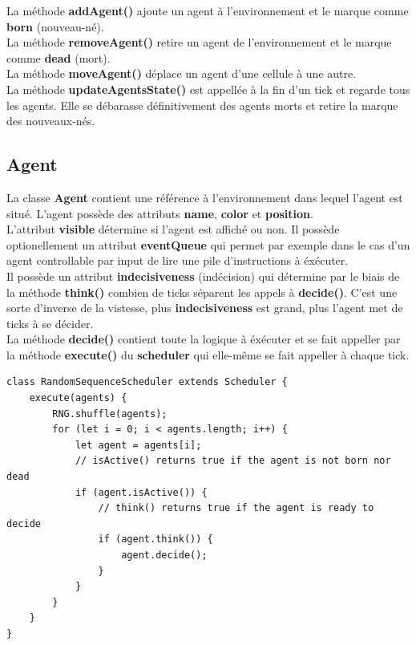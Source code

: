 \documentclass[11pt,a4paper,oneside]{report}
\begin{document}
\par
La méthode \textbf{addAgent()} ajoute un agent à l'environnement et le marque comme \textbf{born} (nouveau-né).\\
La méthode \textbf{removeAgent()} retire un agent de l'environnement et le marque comme \textbf{dead} (mort).\\
La méthode \textbf{moveAgent()} déplace un agent d'une cellule à une autre.\\
La méthode \textbf{updateAgentsState()} est appellée à la fin d'un tick et regarde tous les agents. Elle se débarasse définitivement des agents morts et retire la marque des nouveaux-nés.

\newpage

\subsection*{Agent}
La classe \textbf{Agent} contient une référence à l'environnement dans lequel l'agent est situé. L'agent possède des attributs \textbf{name}, \textbf{color} et \textbf{position}.\\
L'attribut \textbf{visible} détermine si l'agent est affiché ou non.
Il possède optionellement un attribut \textbf{eventQueue} qui permet par exemple dans le cas d'un agent controllable par input de lire une pile d'instructions à éxécuter.\\
Il possède un attribut \textbf{indecisiveness} (indécision) qui détermine par le biais de la méthode \textbf{think()} combien de ticks séparent les appels à \textbf{decide()}. C'est une sorte d'inverse de la vistesse, plus \textbf{indecisiveness} est grand, plus l'agent met de ticks à se décider.\\
La méthode \textbf{decide()} contient toute la logique à éxécuter et se fait appeller par la méthode \textbf{execute()} du \textbf{scheduler} qui elle-même se fait appeller à chaque tick.\\

\begin{lstlisting}
class RandomSequenceScheduler extends Scheduler {
    execute(agents) {
        RNG.shuffle(agents);
        for (let i = 0; i < agents.length; i++) {
            let agent = agents[i];
            // isActive() returns true if the agent is not born nor dead
            if (agent.isActive()) {
                // think() returns true if the agent is ready to decide
                if (agent.think()) {
                    agent.decide();
                }
            }
        }
    }
}
\end{lstlisting}
\end{document}

